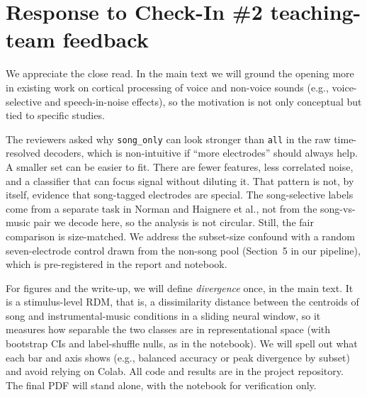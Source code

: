 \documentclass[11pt]{article}
\begin{document}
\section*{Response to Check-In \#2 teaching-team feedback}

We appreciate the close read. In the main text we will ground the opening more in existing work on cortical processing of voice and non-voice sounds (e.g., voice-selective and speech-in-noise effects), so the motivation is not only conceptual but tied to specific studies.

The reviewers asked why \texttt{song\_only} can look stronger than \texttt{all} in the raw time-resolved decoders, which is non-intuitive if ``more electrodes'' should always help. A smaller set can be easier to fit. There are fewer features, less correlated noise, and a classifier that can focus signal without diluting it. That pattern is not, by itself, evidence that song-tagged electrodes are special. The song-selective labels come from a separate task in Norman and Haignere et al., not from the song-vs-music pair we decode here, so the analysis is not circular. Still, the fair comparison is size-matched. We address the subset-size confound with a random seven-electrode control drawn from the non-song pool (Section~5 in our pipeline), which is pre-registered in the report and notebook.

For figures and the write-up, we will define \emph{divergence} once, in the main text. It is a stimulus-level RDM, that is, a dissimilarity distance between the centroids of song and instrumental-music conditions in a sliding neural window, so it measures how separable the two classes are in representational space (with bootstrap CIs and label-shuffle nulls, as in the notebook). We will spell out what each bar and axis shows (e.g., balanced accuracy or peak divergence by subset) and avoid relying on Colab. All code and results are in the project repository. The final PDF will stand alone, with the notebook for verification only.
\end{document}
